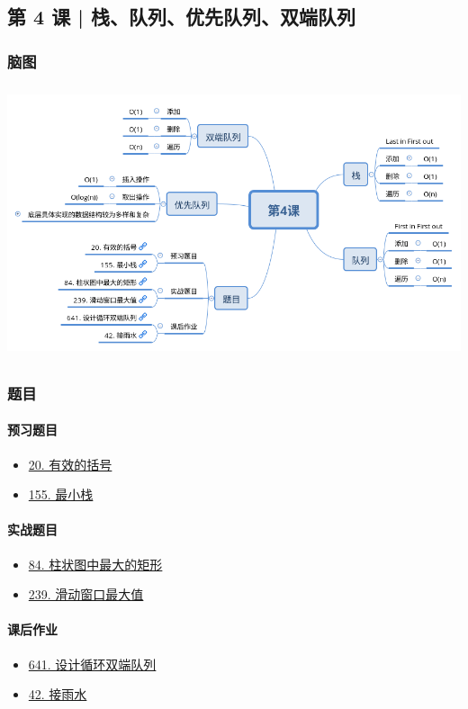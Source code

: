 \subsection{第 4 课 | 栈、队列、优先队列、双端队列}

\subsubsection{脑图}

\includegraphics[width=170mm,height=80mm]{images/第4课.png}

\subsubsection{题目}

\paragraph{预习题目}

\begin{itemize}
  \item \hyperref[leetcode:20]{20. 有效的括号}
  \item \hyperref[leetcode:155]{155. 最小栈}
\end{itemize}

\paragraph{实战题目}

\begin{itemize}
  \item \hyperref[leetcode:84]{84. 柱状图中最大的矩形}
  \item \hyperref[leetcode:239]{239. 滑动窗口最大值}
\end{itemize}

\paragraph{课后作业}

\begin{itemize}
  \item \hyperref[leetcode:641]{641. 设计循环双端队列}
  \item \hyperref[leetcode:42]{42. 接雨水}
\end{itemize}
